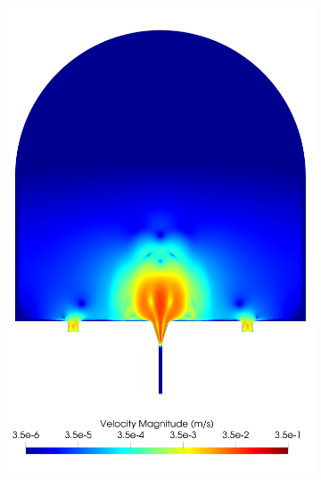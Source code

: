     \begin{figure}
        \begin{subfigure}[b]{0.3\textwidth}
            \centering
            \includegraphics[width=\textwidth]{diagrams/results-modelling/velocity-comparison/meshandsoln_dg_velocity_placentone_14_velocity-log.png}
            \caption{}
            \label{fig:4-models-placentone-norm-log:14}
        \end{subfigure}
        \hfill
        \begin{subfigure}[b]{0.3\textwidth}
            \centering

\end{subfigure}
\end{figure}
